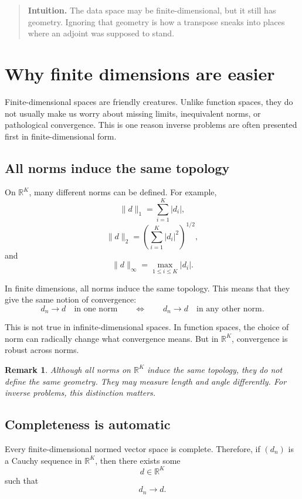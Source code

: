 \documentclass[11pt,a4paper]{book}
\newtheorem{remark}[definition]{Remark}
\newenvironment{intuition}
  {\begin{quote}\textbf{Intuition.}}
  {\end{quote}}
\newcommand{\R}{\mathbb{R}}
\begin{document}
\begin{intuition}
The data space may be finite-dimensional, but it still has geometry.
Ignoring that geometry is how a transpose sneaks into places where an adjoint
was supposed to stand.
\end{intuition}

\section{Why finite dimensions are easier}

Finite-dimensional spaces are friendly creatures. Unlike function spaces, they
do not usually make us worry about missing limits, inequivalent norms, or
pathological convergence. This is one reason inverse problems are often
presented first in finite-dimensional form.

\subsection{All norms induce the same topology}

On $\R^K$, many different norms can be defined. For example,
\[
    \|d\|_1
    =
    \sum_{i=1}^K |d_i|,
\]
\[
    \|d\|_2
    =
    \left(
        \sum_{i=1}^K |d_i|^2
    \right)^{1/2},
\]
and
\[
    \|d\|_\infty
    =
    \max_{1\leq i\leq K}|d_i|.
\]

In finite dimensions, all norms induce the same topology. This means that they
give the same notion of convergence:
\[
    d_n \to d
    \quad
    \text{in one norm}
    \qquad
    \Longleftrightarrow
    \qquad
    d_n \to d
    \quad
    \text{in any other norm}.
\]

This is not true in infinite-dimensional spaces. In function spaces, the choice
of norm can radically change what convergence means. But in $\R^K$, convergence
is robust across norms.

\begin{remark}
Although all norms on $\R^K$ induce the same topology, they do not define the
same geometry. They may measure length and angle differently. For inverse
problems, this distinction matters.
\end{remark}

\subsection{Completeness is automatic}

Every finite-dimensional normed vector space is complete. Therefore, if
$(d_n)$ is a Cauchy sequence in $\R^K$, then there exists some
\[
    d\in\R^K
\]
such that
\[
    d_n \to d.
\]
\end{document}

